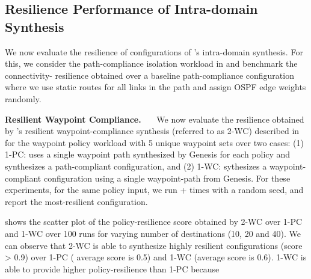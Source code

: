 \subsection{Resilience Performance of Intra-domain Synthesis} \label{sec:mcmceval}
We now evaluate the resilience of configurations 
of \name's intra-domain synthesis. For this, 
we consider the path-compliance isolation workload 
in  and benchmark the connectivity-
resilience obtained over a baseline path-compliance 
configuration 
where we use static routes for all links in the path and 
assign OSPF edge weights randomly.

\noindent\textbf{Resilient Waypoint Compliance.}~~~
We now evaluate the resilience obtained by \name's
resilient waypoint-compliance synthesis (referred to as 2-WC)
described in 
for the waypoint policy workload with 5 unique waypoint sets 
over two cases: (1) 1-PC: \name uses a single waypoint path
synthesized by Genesis for each policy 
and synthesizes a path-compliant configuration, and 
(2) 1-WC: \name sythesizes a waypoint-compliant configuration
using a single waypoint-path from Genesis. For these 
experiments, for the same policy input, we run \genesis +  times with a random seed, and report the most-resilient configuration.

 shows the scatter plot of the policy-resilience 
score obtained by 2-WC over 1-PC and 1-WC over 100 runs
for varying number of destinations (10, 20 and 40). 
We can observe that 2-WC is able to synthesize highly
resilient configurations (score > 0.9) over 1-PC (
average score is 0.5) and 1-WC (average score is 0.6). 
1-WC is able to provide higher policy-resilience than
1-PC because

\begin{figure}
	\centering
\end{figure}
%	


